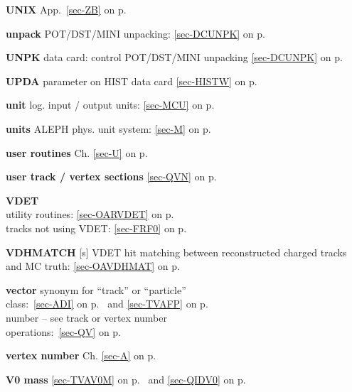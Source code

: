  
 \item{\bf UNIX }App.~\ref{sec-ZB} on p.~\pageref{sec-ZB}\\
 \item{\bf unpack  }POT/DST/MINI unpacking: \ref{sec-DCUNPK} on p.~\pageref{sec-DCUNPK}\\
 \item{\bf UNPK    }data card: control POT/DST/MINI unpacking \ref{sec-DCUNPK} on p.~\pageref{sec-DCUNPK}\\
 \item{\bf UPDA    }parameter on HIST data card
 \ref{sec-HISTW} on p.~\pageref{sec-HISTW}\\
 \item{\bf unit    }log. input / output units: \ref{sec-MCU} on p.~\pageref{sec-MCU}\\
 \item{\bf units   }ALEPH phys. unit system:
 \ref{sec-M} on p.~\pageref{sec-M}\\
 \item{\bf user routines }Ch. \ref{sec-U} on p.~\pageref{sec-U}\\
 \item{\bf user track / vertex sections }\ref{sec-QVN} on p.~\pageref{sec-QVN}
 
 
 \item{\bf VDET  }\\
 \subitem utility routines: \ref{sec-OARVDET} on p.~\pageref{sec-OARVDET}\\
 \subitem tracks not using
 VDET: \ref{sec-FRF0} on p.~\pageref{sec-FRF0}\\
 \item{\bf VDHMATCH }[s] VDET hit matching between  reconstructed charged tracks and MC truth:
 \ref{sec-OAVDHMAT} on p.~\pageref{sec-OAVDHMAT}\\
 \item{\bf vector  }synonym for ``track'' or ``particle''\\
 \subitem class:~\ref{sec-ADI} on p.~\pageref{sec-ADI} and
 \ref{sec-TVAFP} on p.~\pageref{sec-TVAFP}\\
 \subitem number -- see track or vertex number\\
 \subitem operations:~\ref{sec-QV} on p.~\pageref{sec-QV}\\
 \item{\bf vertex number   }Ch. \ref{sec-A} on p.~\pageref{sec-A}\\
 \item{\bf V0 mass }\ref{sec-TVAV0M} on p.~\pageref{sec-TVAV0M} and
 \ref{sec-QIDV0} on p.~\pageref{sec-QIDV0}
 
